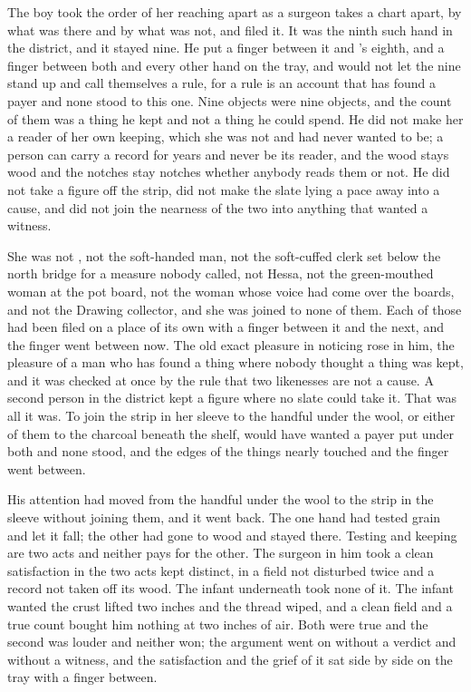 \scenebreak

The boy took the order of her reaching apart as a surgeon takes a chart apart, by what was there and by what was not, and filed it. It was the ninth such hand in the district, and it stayed nine. He put a finger between it and 's eighth, and a finger between both and every other hand on the tray, and would not let the nine stand up and call themselves a rule, for a rule is an account that has found a payer and none stood to this one. Nine objects were nine objects, and the count of them was a thing he kept and not a thing he could spend. He did not make her a reader of her own keeping, which she was not and had never wanted to be; a person can carry a record for years and never be its reader, and the wood stays wood and the notches stay notches whether anybody reads them or not. He did not take a figure off the strip, did not make the slate lying a pace away into a cause, and did not join the nearness of the two into anything that wanted a witness.

She was not , not the soft-handed man, not the soft-cuffed clerk set below the north bridge for a measure nobody called, not Hessa, not the green-mouthed woman at the pot board, not the woman whose voice had come over the boards, and not the Drawing collector, and she was joined to none of them. Each of those had been filed on a place of its own with a finger between it and the next, and the finger went between now. The old exact pleasure in noticing rose in him, the pleasure of a man who has found a thing where nobody thought a thing was kept, and it was checked at once by the rule that two likenesses are not a cause. A second person in the district kept a figure where no slate could take it. That was all it was. To join the strip in her sleeve to the handful under the wool, or either of them to the charcoal beneath the shelf, would have wanted a payer put under both and none stood, and the edges of the things nearly touched and the finger went between.

His attention had moved from the handful under the wool to the strip in the sleeve without joining them, and it went back. The one hand had tested grain and let it fall; the other had gone to wood and stayed there. Testing and keeping are two acts and neither pays for the other. The surgeon in him took a clean satisfaction in the two acts kept distinct, in a field not disturbed twice and a record not taken off its wood. The infant underneath took none of it. The infant wanted the crust lifted two inches and the thread wiped, and a clean field and a true count bought him nothing at two inches of air. Both were true and the second was louder and neither won; the argument went on without a verdict and without a witness, and the satisfaction and the grief of it sat side by side on the tray with a finger between.

